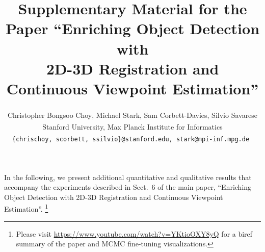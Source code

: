 \documentclass[10pt,twocolumn,letterpaper]{article}
\begin{document}
\title{Supplementary Material for the Paper ``Enriching Object Detection with\\
2D-3D Registration and Continuous Viewpoint Estimation''}

\author{Christopher Bongsoo Choy\textsuperscript{\dag}, Michael Stark\textsuperscript{\ddag}, Sam Corbett-Davies\textsuperscript{\dag}, Silvio Savarese\textsuperscript{\dag}\\
	\textsuperscript{\dag}Stanford University, \textsuperscript{\ddag}Max Planck Institute for Informatics\\
	{\tt\small \{chrischoy, scorbett, ssilvio\}@stanford.edu, \textsuperscript{\ddag}stark@mpi-inf.mpg.de }
}

\maketitle

In the following, we present additional quantitative and qualitative
results that accompany the experiments described in Sect.~6 of the
main paper, ``Enriching Object Detection with 2D-3D Registration and
Continuous Viewpoint Estimation''. \let\thefootnote\relax\footnote{Please visit \href{https://www.youtube.com/watch?v=YKtioOXY8yQ}{https://www.youtube.com/watch?v=YKtioOXY8yQ} for a biref summary of the paper and MCMC fine-tuning visualizations.}
\end{document}
